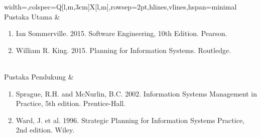 \begin{longtblr}{width=\textwidth,colspec={Q[l,m,3cm]X[l,m]},rowsep=2pt,hlines,vlines,hspan=minimal}
Pustaka Utama & \begin{enumerate}\item Ian Sommerville. 2015. Software Engineering, 10th Edition. Pearson.\item William R. King. 2015. Planning for Information Systems. Routledge.\end{enumerate} \\
Pustaka Pendukung & \begin{enumerate}\item Sprague, R.H. and McNurlin, B.C. 2002. Information Systems Management in Practice, 5th edition. Prentice-Hall.\item Ward, J. et al. 1996. Strategic Planning for Information Systems Practice, 2nd edition. Wiley.\end{enumerate} \\
\end{longtblr}

